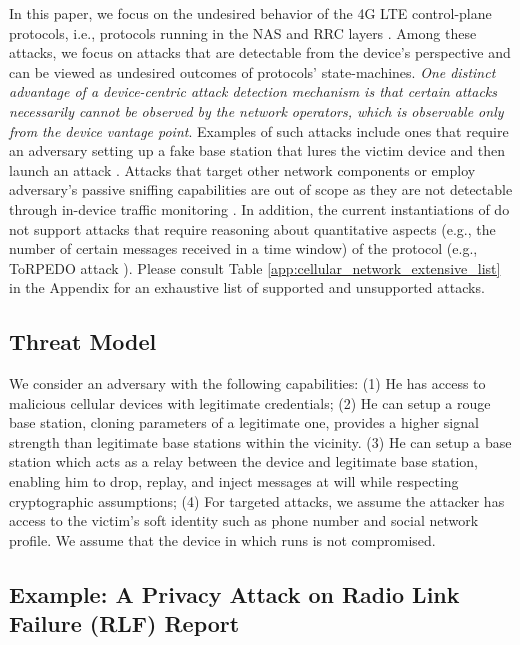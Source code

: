 In this paper, we focus on the undesired behavior
of the 4G LTE control-plane protocols, i.e., protocols
running in the NAS and RRC layers \cite{lteinspector, TORPEDO, privacy_ndss16, kim_ltefuzz_sp19, 5Gformal_authentication_basin,
5g_reasoner, lte_redirection, how_not_to_break_crypto}.
Among these attacks, we focus on attacks that are detectable from the
device's perspective and can be viewed as undesired outcomes of protocols'
state-machines. \emph{One distinct advantage of a device-centric attack detection mechanism
is that certain attacks necessarily cannot be observed by the network operators, which is
observable only from the device vantage point}. Examples of such attacks include ones that require
an adversary setting up a fake base station that lures the victim device and then launch an attack \cite{lteinspector,kim_ltefuzz_sp19, TORPEDO}.
%
Attacks that target other network components
or employ adversary's passive sniffing capabilities are out of scope as they are not detectable
through in-device traffic monitoring \cite{TORPEDO, alter,guti_reallocation_demystified_ndss18}.
In addition, the current instantiations of \system do not support attacks that require reasoning about quantitative
aspects (e.g., the number of certain messages received in a time window) of the protocol (e.g., ToRPEDO attack \cite{TORPEDO}).
Please consult Table \ref{app:cellular_network_extensive_list} in the Appendix for an
exhaustive list of \system supported and unsupported attacks.






\subsection{Threat Model}
We consider an adversary with the following capabilities:
(1) He has access to malicious cellular devices with legitimate
credentials;
(2) He can setup a rouge base station, cloning parameters of a legitimate one,
provides a higher signal strength than legitimate base stations within the vicinity.
(3) He can setup a base station which acts as a relay between the device
and legitimate base station, enabling him to drop, replay, and inject messages
at will while respecting cryptographic assumptions;
(4) For targeted attacks, we assume the attacker has access to the victim's
soft identity such as phone number and social network profile.
We assume that the device in which \system  runs is not compromised.

\subsection{Example: A Privacy Attack on Radio Link Failure (RLF) Report}
\label{sec:running_example}

